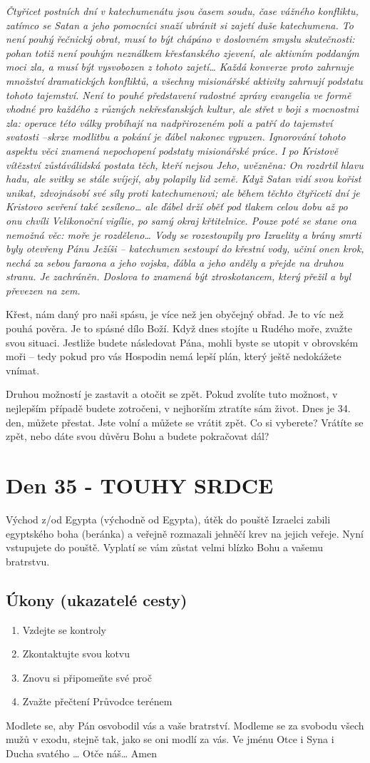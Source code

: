\documentclass[11pt]{article}
\newcommand{\zacatekPatyTyden}{
  Východ z/od Egypta (východně od Egypta), útěk do pouště \newline
  Izraelci zabili egyptského boha (beránka) a veřejně rozmazali jehněčí krev na jejich veřeje. Nyní vstupujete
  do pouště. Vyplatí se vám zůstat velmi blízko Bohu a vašemu bratrstvu.

\subsection*{Úkony (ukazatelé cesty)}
\begin{enumerate}
  \item Vzdejte se kontroly
  \item Zkontaktujte svou kotvu
  \item Znovu si připomeňte své proč
  \item Zvažte přečtení Průvodce terénem
\end{enumerate}
Modlete se, aby Pán osvobodil vás a vaše bratrství. \newline
Modleme se za svobodu všech mužů v exodu, stejně tak, jako se oni modlí za vás.\newline
Ve jménu Otce i Syna i Ducha svatého …  Otče náš… Amen
}
\begin{document}
\textit{Čtyřicet postních dní v katechumenátu jsou časem soudu, čase vážného konfliktu, zatímco se
Satan a jeho pomocníci snaží ubránit si zajetí duše katechumena. To není pouhý řečnický obrat,
musí to být chápáno v doslovném smyslu skutečnosti: pohan totiž není pouhým neználkem
křesťanského zjevení, ale aktivním poddaným moci zla, a musí být vysvobozen z tohoto zajetí…
Každá konverze proto zahrnuje množství dramatických konfliktů, a všechny misionářské aktivity
zahrnují podstatu tohoto tajemství. Není to pouhé představení radostné zprávy evangelia ve
formě vhodné pro každého z různých nekřesťanských kultur, ale střet v boji s mocnostmi zla:
operace této války probíhají na nadpřirozeném poli a patří do tajemství svatosti –skrze modlitbu
a pokání je ďábel nakonec vypuzen. Ignorování tohoto aspektu věci znamená nepochopení
podstaty misionářské práce. I po Kristově vítězství zůstáválidská postata těch, kteří nejsou Jeho,
uvězněna: On rozdrtil hlavu hadu, ale svitky se stále svíjejí, aby polapily lid země. Když Satan
vidí svou kořist unikat, zdvojnásobí své síly proti katechumenovi; ale během těchto čtyřiceti dní je
Kristovo sevření také zesíleno… ale ďábel drží oběť pod tlakem celou dobu až po onu chvíli
Velikonoční vigílie, po samý okraj křtitelnice. Pouze poté se stane ona nemožná věc: moře je
rozděleno…
Vody se rozestoupily pro Izraelity a brány smrti byly otevřeny Pánu Ježíši – katechumen sestoupí
do křestní vody, učiní onen krok, nechá za sebou faraona a jeho vojska, ďábla a jeho anděly a
přejde na druhou stranu. Je zachráněn. Doslova to znamená být ztroskotancem, který přežil a byl
převezen na zem.}

Křest, nám daný pro naši spásu, je více než jen obyčejný obřad. Je to víc než pouhá pověra. Je to spásné dílo
Boží. Když dnes stojíte u Rudého moře, zvažte svou situaci. Jestliže budete následovat Pána, mohli byste se
utopit v obrovském moři – tedy pokud pro vás Hospodin nemá lepší plán, který ještě nedokážete vnímat.

Druhou možností je zastavit a otočit se zpět. Pokud zvolíte tuto možnost, v nejlepším případě budete
zotročeni, v nejhorším ztratíte sám život. Dnes je 34. den, můžete přestat. Jste volní a můžete se vrátit zpět.
Co si vyberete? Vrátíte se zpět, nebo dáte svou důvěru Bohu a budete pokračovat dál?

\newpage
\section{Den 35 - TOUHY SRDCE}
\zacatekPatyTyden
\end{document}
